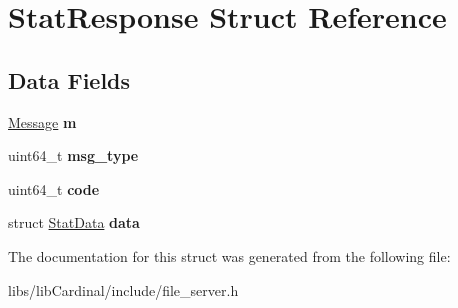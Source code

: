 \hypertarget{structStatResponse}{}\section{Stat\+Response Struct Reference}
\label{structStatResponse}
\subsection*{Data Fields}
\begin{DoxyCompactItemize}
\item 
\hyperlink{structMessage}{Message} {\bfseries m}\hypertarget{structStatResponse_a64d993a7942616a512b59167e47da447}{}\label{structStatResponse_a64d993a7942616a512b59167e47da447}

\item 
uint64\+\_\+t {\bfseries msg\+\_\+type}\hypertarget{structStatResponse_ac56aa64f3dc85b3b05adff62f813c4fb}{}\label{structStatResponse_ac56aa64f3dc85b3b05adff62f813c4fb}

\item 
uint64\+\_\+t {\bfseries code}\hypertarget{structStatResponse_a944d0e70f9b05cd3259a51653b294607}{}\label{structStatResponse_a944d0e70f9b05cd3259a51653b294607}

\item 
struct \hyperlink{structStatData}{Stat\+Data} {\bfseries data}\hypertarget{structStatResponse_adcec2dd73c3e8b9d047c1909718fd932}{}\label{structStatResponse_adcec2dd73c3e8b9d047c1909718fd932}

\end{DoxyCompactItemize}


The documentation for this struct was generated from the following file\+:\begin{DoxyCompactItemize}
\item 
libs/lib\+Cardinal/include/file\+\_\+server.\+h\end{DoxyCompactItemize}
